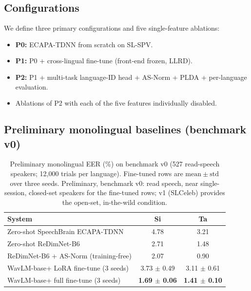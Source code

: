 \documentclass[11pt,a4paper]{article}
\begin{document}
\subsection{Configurations}
\label{sec:exp:configs}

We define three primary configurations and five single-feature
ablations:

\begin{itemize}[leftmargin=*]
    \item \textbf{P0:} ECAPA-TDNN from scratch on SL-SPV.
    \item \textbf{P1:} P0 + cross-lingual fine-tune (front-end frozen,
    LLRD).
    \item \textbf{P2:} P1 + multi-task language-ID head + AS-Norm +
    PLDA + per-language evaluation.
    \item Ablations of P2 with each of the five features individually
    disabled.
\end{itemize}

\subsection{Preliminary monolingual baselines (benchmark v0)}
\label{sec:exp:prelim}


\begin{table}[t]
\centering
\caption{Preliminary monolingual EER (\%) on benchmark v0 (527
read-speech speakers; 12{,}000 trials per language). Fine-tuned rows
are $\mathrm{mean} \pm \mathrm{std}$ over three seeds. Preliminary,
benchmark v0: read speech, near single-session, closed-set speakers
for the fine-tuned rows; v1 (SLCeleb) provides the open-set,
in-the-wild condition.}
\label{tab:prelim}
\begin{tabular}{lcc}
\toprule
\textbf{System} & \textbf{Si} & \textbf{Ta} \\
\midrule
Zero-shot SpeechBrain ECAPA-TDNN            & 4.78 & 3.21 \\
Zero-shot ReDimNet-B6                       & 2.71 & 1.48 \\
ReDimNet-B6 + AS-Norm (training-free)       & 2.07 & 0.90 \\
WavLM-base+ LoRA fine-tune (3 seeds)        & 3.73 $\pm$ 0.49 & 3.11 $\pm$ 0.61 \\
WavLM-base+ full fine-tune (3 seeds)        & \textbf{1.69 $\pm$ 0.06} & \textbf{1.41 $\pm$ 0.10} \\
\bottomrule
\end{tabular}
\end{table}
\end{document}
